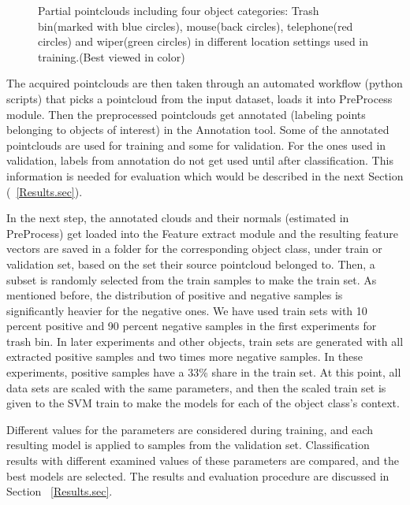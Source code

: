 \begin{figure} [htp]
\begin{center}
  \end{center}
  \caption[Train set pointclouds including four different object class.]
  {Partial pointclouds including four object categories: Trash bin(marked with blue circles), mouse(back circles), telephone(red circles) and wiper(green circles) in different location settings used in training.(Best viewed in color)}
  \label{TrainClouds2.figure:edge}
\end{figure}




The acquired pointclouds are then taken through an automated workflow (python scripts) that picks a pointcloud from the input dataset, loads it into PreProcess module. Then the preprocessed pointclouds get annotated (labeling points belonging to objects of interest) in the Annotation tool.
Some of the annotated pointclouds are used for training and some for validation. 
For the ones used in validation, labels from annotation do not get used until after classification. This information is needed for evaluation which would be described in the next Section (~\ref{Results.sec}).


In the next step, the annotated clouds and their normals (estimated in PreProcess) get loaded into the Feature extract module 
and the resulting feature vectors are saved in a folder for the corresponding object class, under train or validation set, based on the set their source pointcloud belonged to.
Then, a subset is randomly selected from the train samples to make the train set. As mentioned before, the distribution of positive and negative samples is significantly heavier for the negative ones. We have used train sets with 10 percent positive and 90 percent negative samples in the first experiments for trash bin. In later experiments and other objects, train sets are generated with all extracted positive samples and two times more negative samples. In these experiments, positive samples have a 33\% share in the train set. At this point, all data sets are scaled with the same parameters, and then the scaled train set is given to the SVM train to make the models for each of the object class's context. 


Different values for the parameters are considered during training, and each resulting model is applied to samples from the validation
set. Classification results with different examined values of these parameters are compared, and the best models are selected. 
The results and evaluation procedure are discussed in Section ~\ref{Results.sec}.

